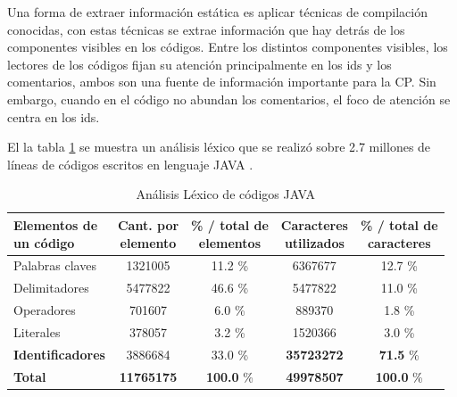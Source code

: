 Una forma de extraer información estática es aplicar técnicas de compilación conocidas, con estas técnicas se extrae información que hay detrás de los componentes visibles en los códigos.
Entre los distintos componentes visibles, los lectores de los códigos fijan su atención principalmente en los ids y los comentarios, ambos son una fuente de información importante para la CP. Sin embargo, cuando en el código no abundan los comentarios, el foco de atención se centra en los ids. 

El la tabla \ref{tabla1} se muestra un análisis léxico que se realizó sobre 2.7 millones de líneas de códigos escritos en lenguaje JAVA \cite{DFPM05,DMDJ13}.

\begin{center}

	\begin{table}[h]	
		\centering
   		\begin{tabular}{| l | c | c | c | c | }  
       
       \hline
  	   \shortstack{\textbf{Elementos de} \\ \textbf{un código}} & \shortstack{\textbf{Cant. por}\\\textbf{elemento}} & \shortstack{\textbf{\% / total de}\\\textbf{elementos}} & \shortstack{\textbf{Caracteres}\\\textbf{utilizados}} & \shortstack{\textbf{\% / total de}\\\textbf{caracteres}} \\ \hline
  	   Palabras claves & 1321005 & 11.2 \% & 6367677 & 12.7 \%\\ \hline
   	   Delimitadores & 5477822 & 46.6 \% & 5477822 & 11.0 \%\\ \hline
       Operadores & 701607 & 6.0 \% & 889370 & 1.8 \%\\ \hline
       Literales & 378057 & 3.2 \% & 1520366 & 3.0 \%\\ \hline          
       \textbf{Identificadores} & 3886684 & 33.0 \% & \textbf{35723272} & \textbf{71.5} \%\\ \hline
       \textbf{Total} & \textbf{11765175} & \textbf{100.0} \% & \textbf{49978507} & \textbf{100.0} \%\\ \hline
     
   	\end{tabular}  
	   
   \caption{Análisis Léxico de códigos JAVA}
   \label{tabla1}
   
  \end{table} 

\end{center}


